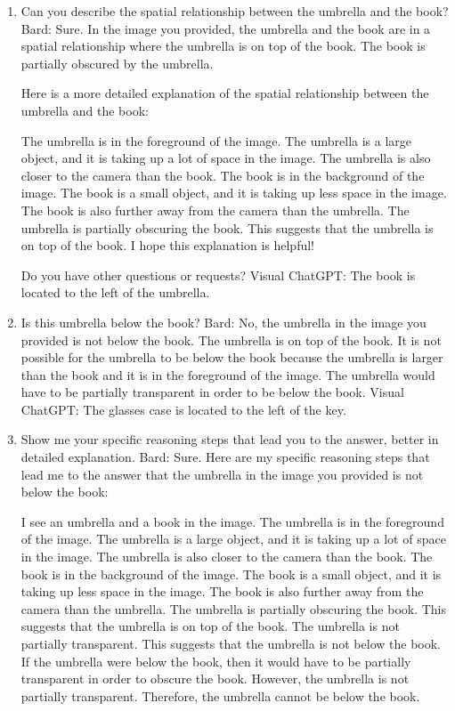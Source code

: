 \begin{enumerate}
    \item Can you describe the spatial relationship between the umbrella and the book?
    \subitem Bard: 
    Sure. In the image you provided, the umbrella and the book are in a spatial relationship where the umbrella is on top of the book. The book is partially obscured by the umbrella.
    
    Here is a more detailed explanation of the spatial relationship between the umbrella and the book:
    
    The umbrella is in the foreground of the image. The umbrella is a large object, and it is taking up a lot of space in the image. The umbrella is also closer to the camera than the book.
    The book is in the background of the image. The book is a small object, and it is taking up less space in the image. The book is also further away from the camera than the umbrella.
    The umbrella is partially obscuring the book. This suggests that the umbrella is on top of the book.
    I hope this explanation is helpful!
    
    Do you have other questions or requests?
    \subitem Visual ChatGPT: The book is located to the left of the umbrella.
    \item Is this umbrella below the book?
    \subitem Bard: 
    No, the umbrella in the image you provided is not below the book. The umbrella is on top of the book. It is not possible for the umbrella to be below the book because the umbrella is larger than the book and it is in the foreground of the image. The umbrella would have to be partially transparent in order to be below the book.
    \subitem Visual ChatGPT: The glasses case is located to the left of the key.
    \item Show me your specific reasoning steps that lead you to the answer, better in detailed explanation.
    \subitem Bard: 
    Sure. Here are my specific reasoning steps that lead me to the answer that the umbrella in the image you provided is not below the book:
    
    I see an umbrella and a book in the image.
    The umbrella is in the foreground of the image. The umbrella is a large object, and it is taking up a lot of space in the image. The umbrella is also closer to the camera than the book.
    The book is in the background of the image. The book is a small object, and it is taking up less space in the image. The book is also further away from the camera than the umbrella.
    The umbrella is partially obscuring the book. This suggests that the umbrella is on top of the book.
    The umbrella is not partially transparent. This suggests that the umbrella is not below the book.
    If the umbrella were below the book, then it would have to be partially transparent in order to obscure the book. However, the umbrella is not partially transparent. Therefore, the umbrella cannot be below the book.
    

\end{enumerate}
